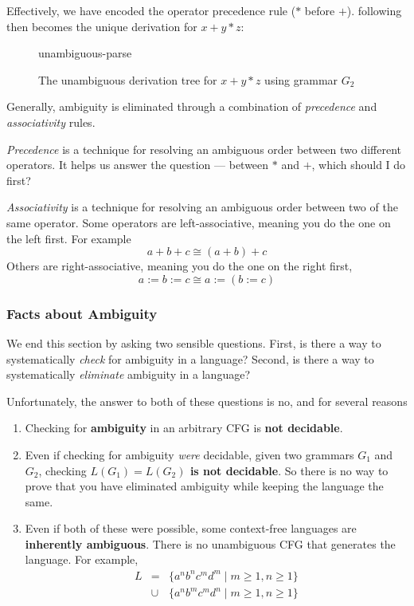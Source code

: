 Effectively, we have encoded the operator precedence rule ($*$ before $+$).  following then becomes the unique derivation for $x + y * z$:

\begin{figure}[H]
    \centering
    {unambiguous-parse}
    \caption{The unambiguous derivation tree for $x+y*z$ using grammar $G_2$}
    \label{figure:unambiguous-parse}
\end{figure}

Generally, ambiguity is eliminated through a combination of \textit{precedence} and \textit{associativity} rules. 

\textit{Precedence} is a technique for resolving an ambiguous order between two different operators. It helps us answer the question --- between $*$ and $+$, which should I do first?

\textit{Associativity} is a technique for resolving an ambiguous order between two of the same operator. Some operators are left-associative, meaning you do the one on the left first. For example
\[a + b + c \cong (a + b) + c\]
Others are right-associative, meaning you do the one on the right first,
\[a := b := c \cong a:= (b := c) \]
\subsubsection{Facts about Ambiguity}
We end this section by asking two sensible questions. First, is there a way to systematically \textit{check} for ambiguity in a language? Second, is there a way to systematically \textit{eliminate} ambiguity in a language?

Unfortunately, the answer to both of these questions is no, and for several reasons
\begin{enumerate}
\item Checking for \textbf{ambiguity} in an arbitrary CFG is \textbf{not decidable}.
\item Even if checking for ambiguity \textit{were} decidable, given two grammars $G_1$ and $G_2$, checking
\textbf{$L(G_1) = L(G_2)$ is not decidable}. So there is no way to prove that you have eliminated ambiguity while keeping the language the same.
\item Even if both of these were possible, some context-free languages are \textbf{inherently ambiguous}. There is no unambiguous CFG that generates the language. For example,
\[
\begin{array}{lll}
  L &=& \{ a^nb^nc^md^m \mid m \ge 1, n \ge 1 \}\\
  &\cup& \{ a^nb^mc^md^n \mid m \ge 1, n \ge 1 \}
\end{array}
\]
\end{enumerate}

